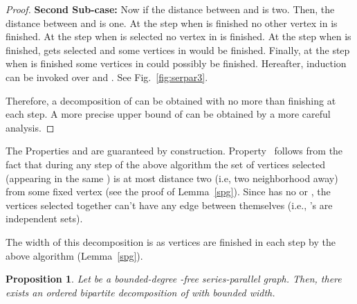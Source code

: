 \documentclass[11pt]{article}
\newtheorem{proposition}[theorem]{Proposition}
\newcommand{\FI}[1]{Fig.\ \ref{#1}}
\begin{document}
\begin{proof}
\noindent \textbf{Second Sub-case:} Now if the distance between  and  is two. Then,  the distance between  and  is one. At the step when  is finished no other vertex in  is finished. At the step when  is selected no vertex in  is finished. At the step when  is finished,  gets selected and  some vertices in  would be finished. Finally, at the step when  is finished some vertices in  could possibly be finished. Hereafter, induction can be invoked over  and .  See \FI{fig:serpar3}.



Therefore, a decomposition of  can be obtained with no more than  finishing at each step. A more precise upper bound of  can be obtained by a more careful analysis. 
\end{proof}

The Properties  and  are guaranteed by construction.  Property~ follows from the fact that  during any step of the above algorithm the set of vertices selected (appearing in the same ) is at most distance two (i.e, two neighborhood away) from some fixed vertex (see the proof of Lemma~\ref{spg}). Since  has no  or , the vertices selected together can't have any edge between themselves (i.e., 's are independent sets).  

The width of this decomposition is  as  vertices are finished in each step by the above algorithm (Lemma~\ref{spg}).


\begin{proposition} \label{prop:4}
Let  be a bounded-degree -free series-parallel graph. Then, there exists an ordered bipartite decomposition of  with bounded width.
\end{proposition}
\end{document}
